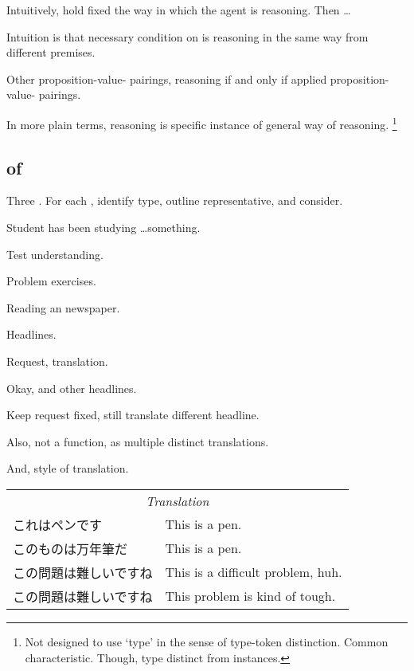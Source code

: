 \begin{note}
  Intuitively, hold fixed the way in which the agent is reasoning.
  Then \dots

  Intuition is that necessary condition on \tR{} is reasoning in the same way from different premises.

    Other proposition-value-\poP{} pairings, reasoning if and only if applied proposition-value-\poP{} pairings.

  In more plain terms, reasoning is specific instance of general way of reasoning.%
  \footnote{
    Not designed to use `type' in the sense of type-token distinction.
    Common characteristic.
    Though, type distinct from instances.
  }
\end{note}

\subsection{ of \tR{}}
\label{sec:illu3}

\begin{note}
  Three .
  For each , identify type, outline representative, and consider.
\end{note}


\begin{note}
  \begin{illustration}[Textbook]
    Student has been studying \dots something.

    Test understanding.

    Problem exercises.
  \end{illustration}
\end{note}

\begin{note}
  \begin{illustration}[Translation]
    Reading an newspaper.

    Headlines.

    Request, translation.

    Okay, and other headlines.
  \end{illustration}

  Keep request fixed, still translate different headline.

  Also, not a function, as multiple distinct translations.

  And, style of translation.

  \begin{center}
    \begin{tabular}[h]{p{.55\linewidth}|p{.4\linewidth}}
      \multicolumn{2}{c}{\emph{Translation}} \\
      これはペンです & This is a pen. \\
      このものは万年筆だ & This is a pen. \\
      この問題は難しいですね & This is a difficult problem, huh. \\
      この問題は難しいですね & This problem is kind of tough. \\
    \end{tabular}
  \end{center}
\end{note}

